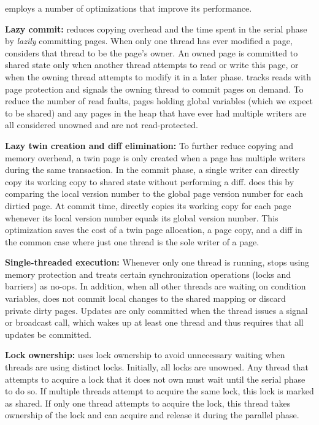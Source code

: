 \label{sec:dthreads-optimizations}

\dthreads{} employs a number of optimizations that improve its performance.

\textbf{Lazy commit:}
\dthreads{} reduces copying overhead and the time spent in the serial
phase by \emph{lazily} committing pages. When only one thread has ever
modified a page, \dthreads{} considers that thread to be the page's
owner.  An owned page is committed to shared state only when another
thread attempts to read or write this page, or when the owning thread attempts to modify it in a later phase. \dthreads{} tracks reads with page protection and signals
the owning thread to commit pages on demand. To reduce the number of
read faults, pages holding global variables (which we expect to be
shared) and any pages in the heap that have ever had multiple writers are
all considered unowned and are not read-protected.

\textbf{Lazy twin creation and diff elimination: }
To further reduce copying and memory overhead, a twin page is only created
when a page has multiple writers during the same transaction.
In the commit phase, a single writer can directly copy its working copy to
shared state without performing a diff. \dthreads{} does this by
comparing the local version number to the global page version number
for each dirtied page.  At commit time, \dthreads{} directly copies
its working copy for each page whenever its local version number
equals its global version number.  This optimization saves the cost of a twin 
page allocation, a page copy, and a diff in the common case where just one thread is the sole writer of a page.

\textbf{Single-threaded execution: }
Whenever only one thread is running, \dthreads{} stops using memory protection 
and treats certain synchronization operations (locks and barriers) as no-ops.
In addition, when all other threads are waiting on condition variables, 
\dthreads{} does not commit local changes to the shared mapping or discard  
private dirty pages. Updates are only committed when the thread
issues a signal or broadcast call, which wakes up at least one thread
and thus requires that all updates be committed.

\textbf{Lock ownership: }
\dthreads{} uses lock ownership to avoid unnecessary waiting when threads are
using distinct locks.  Initially, all locks are unowned.  Any thread that
attempts to acquire a lock that it does not own must wait until the serial phase
to do so.  If multiple threads attempt to acquire the same lock, this lock is 
marked as shared.  If only one thread attempts to acquire the lock, this thread 
takes ownership of the lock and can acquire and release it during the parallel
phase.

